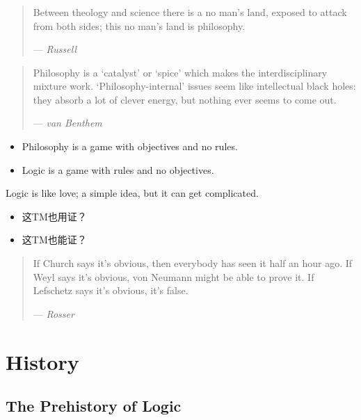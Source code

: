 \documentclass[UTF8,11pt,colorlinks,compress,openany]{beamer}%
\begin{document}
\begin{frame}\frametitle{}
\begin{quote}
Between theology and science there is a no man's land, exposed to attack from both sides; this no man's land is philosophy.\par\hfill --- \textsl{Russell}
\end{quote}
\begin{quote}
Philosophy is a `catalyst' or `spice' which makes the interdisciplinary mixture work. `Philosophy-internal' issues seem like intellectual black holes: they absorb a lot of clever energy, but nothing ever seems to come out.\par\hfill --- \textsl{van Benthem}
\end{quote}
	\begin{itemize}
		\item Philosophy is a game with objectives and no rules.
		\item Logic is a game with rules and no objectives. 
	\end{itemize}
	\begin{block}{Logic is like love; a simple idea, but it can get complicated.}
		\begin{itemize}
			\item 这TM也用证？
			\item 这TM也能证？
		\end{itemize}
	\end{block}
	\begin{quote}
		If Church says it's obvious, then everybody has seen it half an hour ago. If Weyl says it's obvious, von Neumann might be able to prove it. If Lefschetz says it's obvious, it's false.\par\hfill --- \textsl{Rosser}
	\end{quote}
\end{frame}


\section{History}


\subsection{The Prehistory of Logic}
\end{document}
